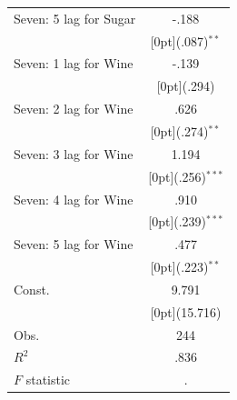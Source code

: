 \documentclass[12pt,a4paper,titlepage]{article}
\begin{document}
{\begin{tabular*}{\textwidth}{@{\extracolsep{\fill}}lc}
Seven: 5 lag for Sugar &	-.188 \\
&	\raisebox{.7ex}[0pt]{\scriptsize (.087)$^{**}$} \\
Seven: 1 lag for Wine &	-.139 \\
&	\raisebox{.7ex}[0pt]{\scriptsize (.294)} \\
Seven: 2 lag for Wine &	.626 \\
&	\raisebox{.7ex}[0pt]{\scriptsize (.274)$^{**}$} \\
Seven: 3 lag for Wine &	1.194 \\
&	\raisebox{.7ex}[0pt]{\scriptsize (.256)$^{***}$} \\
Seven: 4 lag for Wine &	.910 \\
&	\raisebox{.7ex}[0pt]{\scriptsize (.239)$^{***}$} \\
Seven: 5 lag for Wine &	.477 \\
&	\raisebox{.7ex}[0pt]{\scriptsize (.223)$^{**}$} \\
Const. &	9.791 \\
&	\raisebox{.7ex}[0pt]{\scriptsize (15.716)} \\
Obs. &	244 \\
$ R^2$ &	.836 \\
$ F$ statistic &	. \\
\hline\hline	
\end{tabular*}%


}
\end{document}
